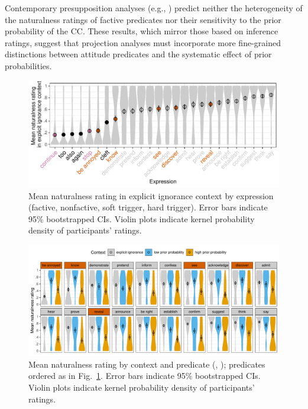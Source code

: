 \documentclass[12pt,fleqn]{article}
\newcommand{\6}{\mbox{$[\hspace*{-.6mm}[$}}
\newcommand{\9}{\mbox{$]\hspace*{-.6mm}]$}}
\begin{document}
Contemporary presupposition analyses (e.g., \citealt{heim83,vds92,abrusan2011,karttunen2016,simons-etal2017}) predict neither the heterogeneity of the naturalness ratings of factive predicates nor their sensitivity to the prior probability of the CC. These results, which mirror those based on inference ratings, suggest that projection analyses must incorporate more fine-grained distinctions between attitude predicates and the systematic effect of prior probabilities.

\newpage

\begin{figure}[h!]
\centering
\caption{\small{Mean naturalness rating in explicit ignorance context by expression (\color{orange}factive\color{black}, \color{gray}nonfactive\color{black}, \color{magenta} soft trigger\color{black}, \color{black}hard trigger\color{black}). Error bars indicate 95\% bootstrapped CIs. Violin plots indicate kernel probability density of participants' ratings.}}\label{fig:acc-by-expression}
\includegraphics[width=.9\textwidth]{../../results/main/13explicitIgnorance/graphs/explicit-ignorance-naturalness-by-predicate}
\end{figure}

\vspace*{-1cm}

\begin{figure}[h!]
\centering
\caption{\small{Mean naturalness rating by context and predicate (, ); predicates ordered as in Fig.~\ref{fig:acc-by-expression}. Error bars indicate 95\% bootstrapped CIs. Violin plots indicate kernel probability density of participants' ratings}.}\label{fig:acc-by-context}
\includegraphics[width=\textwidth]{../../results/main/13explicitIgnorance/graphs/ORDER-by-LANGUAGE-naturalness-by-context-and-predicate}
\end{figure}

\vspace*{-.7cm}

\renewcommand\bibsection{\subsubsection*{\refname}}
\begin{tiny}


\end{tiny}


 
\end{document}
